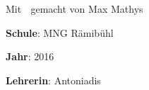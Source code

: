 {\Large Mit 💖 gemacht von Max Mathys 👊}

\vspace{.7em}

\textbf{Schule}: MNG Rämibühl
\vspace{.2em}

\textbf{Jahr}: 2016
\vspace{.2em}

\textbf{Lehrerin}: Antoniadis	